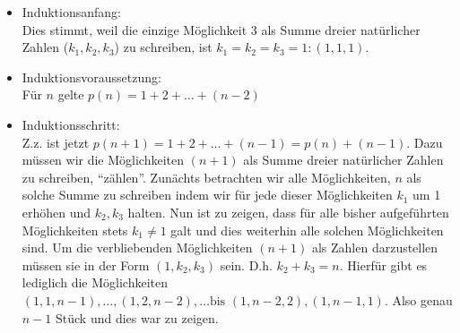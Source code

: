 \documentclass[12pt,a4paper]{report}
\begin{document}
	\begin{itemize}
		\item Induktionsanfang: \\
		Dies stimmt, weil die einzige Möglichkeit 3 als Summe dreier natürlicher Zahlen ($k_1, k_2, k_3$) zu schreiben, ist $k_1=k_2=k_3=1: (1,1,1)$.
		\item Induktionsvoraussetzung: \\
		Für $n$ gelte $p(n) = 1+2+\ldots+(n-2)$
		\item Induktionsschritt: \\
		Z.z. ist jetzt $p(n+1) = 1+2+\ldots+(n-1) = p(n)+(n-1)$. Dazu müssen wir die Möglichkeiten $(n+1)$ als Summe dreier natürlicher Zahlen zu schreiben, \enquote{zählen}. Zunächts betrachten wir alle Möglichkeiten, $n$ als solche Summe zu schreiben indem wir für jede dieser Möglichkeiten $k_1$ um 1 erhöhen und $k_2, k_3$ halten. Nun ist zu zeigen, dass für alle bisher aufgeführten Möglichkeiten stets $k_1 \neq 1$ galt und dies weiterhin alle solchen Möglichkeiten sind. Um die verbliebenden Möglichkeiten $(n+1)$ als Zahlen darzustellen müssen sie in der Form $(1, k_2, k_3)$ sein. D.h. $k_2+k_3 = n$. Hierfür gibt es lediglich die Möglichkeiten $(1, 1, n-1), \ldots, (1,2,n-2),\ldots \text{bis } (1,n-2,2),(1,n-1,1)$. Also genau $n-1$ Stück und dies war zu zeigen. 
	\end{itemize}

	\newpage
\end{document}

